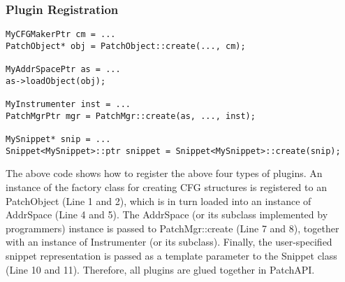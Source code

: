 \subsubsection{Plugin Registration}
\lstset{numbers=left}
\begin{lstlisting}[caption=Example of registering plugins]
MyCFGMakerPtr cm = ...
PatchObject* obj = PatchObject::create(..., cm);

MyAddrSpacePtr as = ...
as->loadObject(obj);

MyInstrumenter inst = ...
PatchMgrPtr mgr = PatchMgr::create(as, ..., inst);

MySnippet* snip = ...
Snippet<MySnippet>::ptr snippet = Snippet<MySnippet>::create(snip);
\end{lstlisting}
The above code shows how to register the above four types of plugins.  An
instance of the factory class for creating CFG structures is registered to an
PatchObject (Line 1 and 2), which is in turn loaded into an instance of
AddrSpace (Line 4 and 5). The AddrSpace (or its subclass implemented by
programmers) instance is passed to PatchMgr::create (Line 7 and 8), together
with an instance of Instrumenter (or its subclass). Finally, the user-specified
snippet representation is passed as a template parameter to the Snippet
class (Line 10 and 11). Therefore, all plugins are glued together in PatchAPI.
